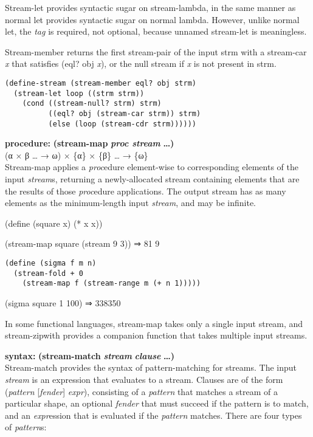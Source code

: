 Stream-let provides syntactic sugar on stream-lambda, in the same manner
as normal let provides syntactic sugar on normal lambda. However, unlike
normal let, the \emph{tag} is required, not optional, because unnamed
stream-let is meaningless.

Stream-member returns the first stream-pair of the input strm with a
stream-car \emph{x} that satisfies (eql? obj \emph{x}), or the null
stream if \emph{x} is not present in strm.

\begin{verbatim}
(define-stream (stream-member eql? obj strm)
  (stream-let loop ((strm strm))
    (cond ((stream-null? strm) strm)
          ((eql? obj (stream-car strm)) strm)
          (else (loop (stream-cdr strm))))))
\end{verbatim}

\textbf{procedure:} \textbf{(stream-map} \textbf{\emph{proc stream}}
\textbf{\ldots{})}\\
(α × β \ldots{} → ω) × \{α\} × \{β\} \ldots{} → \{ω\}\\
Stream-map applies a \emph{proc}edure element-wise to corresponding
elements of the input \emph{stream}s, returning a newly-allocated stream
containing elements that are the results of those \emph{proc}edure
applications. The output stream has as many elements as the
minimum-length input \emph{stream}, and may be infinite.

(define (square x) (* x x))

(stream-map square (stream 9 3)) ⇒ 81 9

\begin{verbatim}
(define (sigma f m n)
  (stream-fold + 0
    (stream-map f (stream-range m (+ n 1)))))
\end{verbatim}

(sigma square 1 100) ⇒ 338350

In some functional languages, stream-map takes only a single input
stream, and stream-zipwith provides a companion function that takes
multiple input streams.

\textbf{syntax:} \textbf{(stream-match} \textbf{\emph{stream}} \textbf{}
\textbf{\emph{clause}} \textbf{\ldots{})}\\
Stream-match provides the syntax of pattern-matching for streams. The
input \emph{stream} is an expression that evaluates to a stream. Clauses
are of the form (\emph{pattern} {[}\emph{fender}{]} \emph{expr}),
consisting of a \emph{pattern} that matches a stream of a particular
shape, an optional \emph{fender} that must succeed if the pattern is to
match, and an \emph{expr}ession that is evaluated if the \emph{pattern}
matches. There are four types of \emph{pattern}s:

